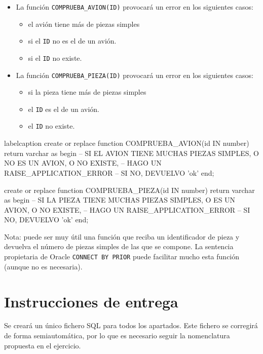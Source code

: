 \needspace{.15\textheight}
\begin{homeworkProblem}
  \begin{itemize}

  \item La función \texttt{COMPRUEBA\_AVION(ID)} provocará un error en los siguientes casos:
    \begin{itemize}
    \item el avión tiene más de {\maximopiezasavion} piezas simples
    \item si el \texttt{ID} no es el de un avión.
    \item si el \texttt{ID} no existe.
    \end{itemize}
  \item La función \texttt{COMPRUEBA\_PIEZA(ID)} provocará un error en los siguientes casos:
    \begin{itemize}
    \item si la pieza tiene más de {\maximopiezaspieza} piezas simples
    \item el \texttt{ID} es el de un avión.
    \item el \texttt{ID} no existe.
    \end{itemize}
  \end{itemize}

  
\begin{listadosql}{label}{caption}
create or replace function COMPRUEBA_AVION(id IN number) return varchar 
as
begin
  -- SI EL AVION TIENE MUCHAS PIEZAS SIMPLES, O NO ES UN AVION, O NO EXISTE, 
  --   HAGO UN RAISE_APPLICATION_ERROR
  -- SI NO, DEVUELVO 'ok'
end; 

create or replace function COMPRUEBA_PIEZA(id IN number) return varchar 
as
begin
  -- SI LA PIEZA TIENE MUCHAS PIEZAS SIMPLES, O ES UN AVION, O NO EXISTE,
  --   HAGO UN RAISE_APPLICATION_ERROR
  -- SI NO, DEVUELVO 'ok'
end; 
\end{listadosql}

    Nota: puede ser muy útil una función que reciba un identificador de pieza y devuelva el número de piezas simples de las que se compone. La sentencia propietaria de Oracle \texttt{CONNECT BY PRIOR} puede facilitar mucho esta función (aunque no es necesaria).


\end{homeworkProblem}

\section{Instrucciones de entrega}
Se creará un único fichero SQL para todos los apartados. Este fichero se corregirá de forma semiautomática, por lo que es necesario seguir la nomenclatura propuesta en el ejercicio.

